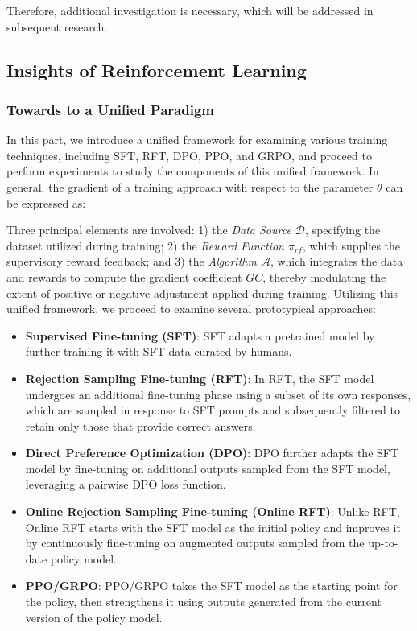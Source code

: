Therefore, additional investigation is necessary, which will be addressed in subsequent research.

\subsection{Insights of Reinforcement Learning}
\subsubsection{Towards to a Unified Paradigm} In this part, we introduce a unified framework for examining various training techniques, including SFT, RFT, DPO, PPO, and GRPO, and proceed to perform experiments to study the components of this unified framework. In general, the gradient of a training approach with respect to the parameter $\theta$ can be expressed as:

Three principal elements are involved: 1) the \textit{Data Source $\mathcal{D}$}, specifying the dataset utilized during training; 2) the \textit{Reward Function $\pi_{{rf}}$}, which supplies the supervisory reward feedback; and 3) the \textit{Algorithm $\mathcal{A}$}, which integrates the data and rewards to compute the gradient coefficient $GC$, thereby modulating the extent of positive or negative adjustment applied during training. Utilizing this unified framework, we proceed to examine several prototypical approaches:

\begin{itemize}
    \item \textbf{Supervised Fine-tuning (SFT)}: SFT adapts a pretrained model by further training it with SFT data curated by humans.
    \item \textbf{Rejection Sampling Fine-tuning (RFT)}: In RFT, the SFT model undergoes an additional fine-tuning phase using a subset of its own responses, which are sampled in response to SFT prompts and subsequently filtered to retain only those that provide correct answers.
    \item \textbf{Direct Preference Optimization (DPO)}: DPO further adapts the SFT model by fine-tuning on additional outputs sampled from the SFT model, leveraging a pairwise DPO loss function.
    \item \textbf{Online Rejection Sampling Fine-tuning (Online RFT)}: Unlike RFT, Online RFT starts with the SFT model as the initial policy and improves it by continuously fine-tuning on augmented outputs sampled from the up-to-date policy model.
    \item \textbf{PPO/GRPO}: PPO/GRPO takes the SFT model as the starting point for the policy, then strengthens it using outputs generated from the current version of the policy model.
\end{itemize}


